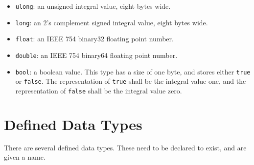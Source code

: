 \documentclass[letterpaper,12pt]{book}
\begin{document}
\begin{itemize}
	\item \texttt{ulong}: an unsigned integral value, eight bytes wide.
	
	\item \texttt{long}: an 2's complement signed integral value, eight bytes wide.
	
	\item \texttt{float}: an IEEE 754 binary32 floating point number.
	
	\item \texttt{double}: an IEEE 754 binary64 floating point number.
	
	\item \texttt{bool}: a boolean value. This type has a size of one byte, and stores either \texttt{true} or \texttt{false}. The representation of \texttt{true} shall be the integral value one, and the representation of \texttt{false} shall be the integral value zero.
\end{itemize}

\section{Defined Data Types}

There are several defined data types. These need to be declared to exist, and are given a name.
\end{document}
